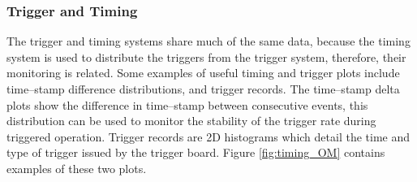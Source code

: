 \subsubsection*{Trigger and Timing}
The trigger and timing systems share much of the same data, because the timing
system is used to distribute the triggers from the trigger system, therefore, 
their monitoring is related. Some examples of useful timing and trigger plots 
include time--stamp difference distributions, and trigger records. The 
time--stamp delta plots show the difference in time--stamp between consecutive 
events, this distribution can be used to monitor the stability of the trigger 
rate during triggered operation. Trigger records are 2D histograms which 
detail the time and type of trigger issued by the trigger board. Figure 
\ref{fig:timing_OM} contains examples of these two plots.

